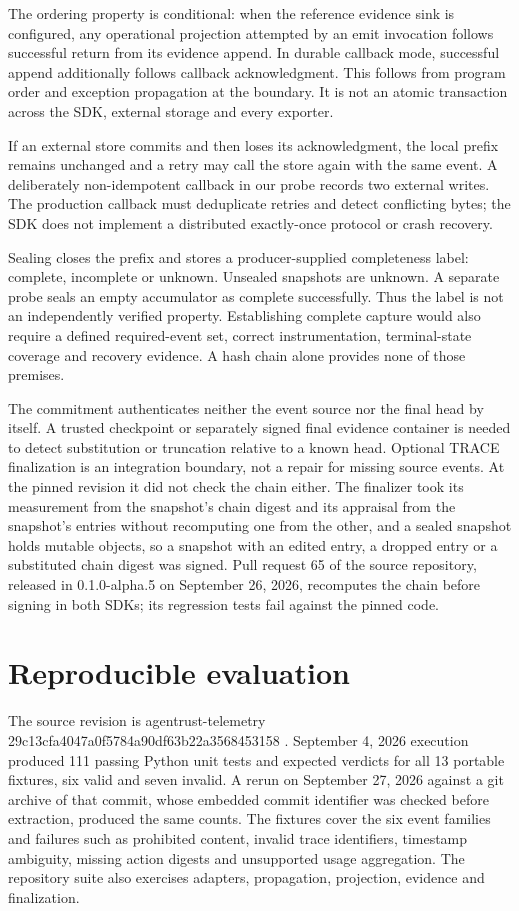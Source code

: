 \documentclass[10pt,letterpaper]{article}
\begin{document}
The ordering property is conditional: when the reference evidence sink is configured, any operational projection attempted by an emit invocation follows successful return from its evidence append. In durable callback mode, successful append additionally follows callback acknowledgment. This follows from program order and exception propagation at the boundary. It is not an atomic transaction across the SDK, external storage and every exporter.


If an external store commits and then loses its acknowledgment, the local prefix remains unchanged and a retry may call the store again with the same event. A deliberately non-idempotent callback in our probe records two external writes. The production callback must deduplicate retries and detect conflicting bytes; the SDK does not implement a distributed exactly-once protocol or crash recovery.


Sealing closes the prefix and stores a producer-supplied completeness label: complete, incomplete or unknown. Unsealed snapshots are unknown. A separate probe seals an empty accumulator as complete successfully. Thus the label is not an independently verified property. Establishing complete capture would also require a defined required-event set, correct instrumentation, terminal-state coverage and recovery evidence. A hash chain alone provides none of those premises.


The commitment authenticates neither the event source nor the final head by itself. A trusted checkpoint or separately signed final evidence container is needed to detect substitution or truncation relative to a known head. Optional TRACE finalization is an integration boundary, not a repair for missing source events. At the pinned revision it did not check the chain either. The finalizer took its measurement from the snapshot's chain digest and its appraisal from the snapshot's entries without recomputing one from the other, and a sealed snapshot holds mutable objects, so a snapshot with an edited entry, a dropped entry or a substituted chain digest was signed. Pull request 65 of the source repository, released in 0.1.0-alpha.5 on September 26, 2026, recomputes the chain before signing in both SDKs; its regression tests fail against the pinned code.


\section{Reproducible evaluation}

The source revision is agentrust-telemetry 29c13cfa4047a0f5784a90df63b22a3568453158 \cite{ref7}. September 4, 2026 execution produced 111 passing Python unit tests and expected verdicts for all 13 portable fixtures, six valid and seven invalid. A rerun on September 27, 2026 against a git archive of that commit, whose embedded commit identifier was checked before extraction, produced the same counts. The fixtures cover the six event families and failures such as prohibited content, invalid trace identifiers, timestamp ambiguity, missing action digests and unsupported usage aggregation. The repository suite also exercises adapters, propagation, projection, evidence and finalization.
\end{document}
